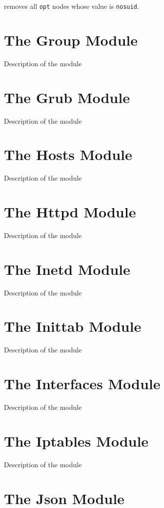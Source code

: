 removes all \verb!opt! nodes whose value is \verb!nosuid!.

\section{The Group Module}

Description of the module

\section{The Grub Module}

Description of the module

\section{The Hosts Module}

Description of the module

\section{The Httpd Module}

Description of the module

\section{The Inetd Module}

Description of the module

\section{The Inittab Module}

Description of the module

\section{The Interfaces Module}

Description of the module

\section{The Iptables Module}

Description of the module

\section{The Json Module}

